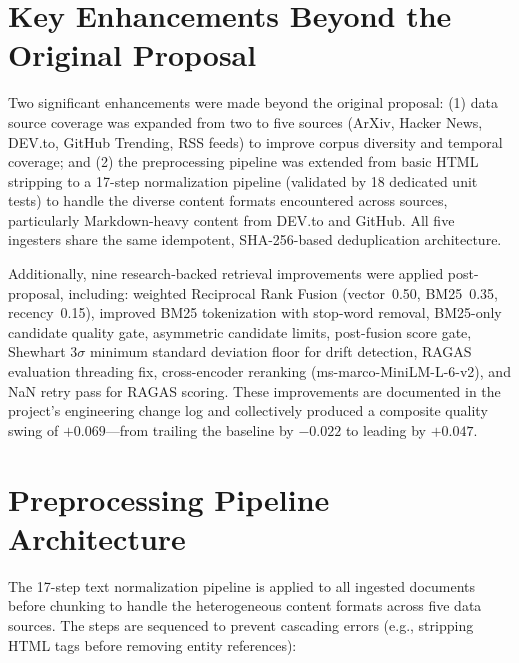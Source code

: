 \section{Key Enhancements Beyond the Original Proposal}
\label{sec:enhancements}

Two significant enhancements were made beyond the original proposal: (1) data source coverage was expanded from two to five sources (ArXiv, Hacker News, DEV.to, GitHub Trending, RSS feeds) to improve corpus diversity and temporal coverage; and (2) the preprocessing pipeline was extended from basic HTML stripping to a 17-step normalization pipeline (validated by 18 dedicated unit tests) to handle the diverse content formats encountered across sources, particularly Markdown-heavy content from DEV.to and GitHub. All five ingesters share the same idempotent, SHA-256-based deduplication architecture.

Additionally, nine research-backed retrieval improvements were applied post-proposal, including: weighted Reciprocal Rank Fusion (vector~0.50, BM25~0.35, recency~0.15), improved BM25 tokenization with stop-word removal, BM25-only candidate quality gate, asymmetric candidate limits, post-fusion score gate, Shewhart $3\sigma$ minimum standard deviation floor for drift detection, RAGAS evaluation threading fix, cross-encoder reranking (ms-marco-MiniLM-L-6-v2), and NaN retry pass for RAGAS scoring. These improvements are documented in the project's engineering change log and collectively produced a composite quality swing of $+0.069$---from trailing the baseline by $-0.022$ to leading by $+0.047$.

\section{Preprocessing Pipeline Architecture}
\label{sec:preprocessing_detail}

The 17-step text normalization pipeline is applied to all ingested documents before chunking to handle the heterogeneous content formats across five data sources. The steps are sequenced to prevent cascading errors (e.g., stripping HTML tags before removing entity references):

